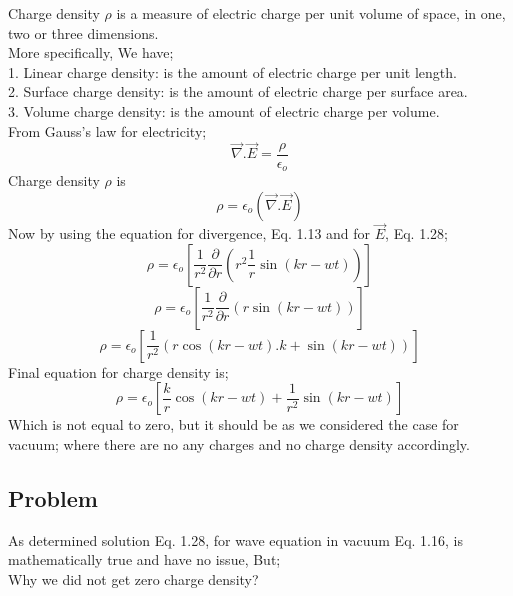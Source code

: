 Charge density $\rho$ is a measure of electric charge per unit volume of space, in one, two or three dimensions.\\
More specifically, We have;\\
1. Linear charge density: is the amount of electric charge per unit length.\\
2. Surface charge density: is the amount of electric charge per surface area.\\
3. Volume charge density: is the amount of electric charge per volume.\\
From Gauss's law for electricity;\\
\begin{equation}
\vec{\nabla}.\vec{E} = \frac{\rho}{\epsilon_{o}}
\end{equation}
Charge density $\rho$ is\\
\begin{equation}
\rho = {\epsilon_{o}}(\vec{\nabla}.\vec{E})
\end{equation}
Now by using the equation for divergence, Eq. 1.13 and for $\vec{E}$, Eq. 1.28;\\
\begin{equation}
\rho = {\epsilon_{o}}[\frac{1}{r^2}\frac{\partial}{\partial r}(r^2\frac{1}{r}\sin(kr-wt))]
\end{equation}
\begin{equation}
\rho = {\epsilon_{o}}[\frac{1}{r^2}\frac{\partial}{\partial r}(r\sin(kr-wt))]
\end{equation}
\begin{equation}
\rho = {\epsilon_{o}}[\frac{1}{r^2}(r\cos(kr-wt).k+\sin(kr-wt))]
\end{equation}
Final equation for charge density is;\\
\begin{equation}
\rho = {\epsilon_{o}}[\frac{k}{r}\cos(kr-wt)+\frac{1}{r^2}\sin(kr-wt)]
\end{equation}
Which is not equal to zero, but it should be as we considered the case for vacuum; where there are no any charges and no charge density accordingly.\\

\subsection{Problem}
As determined solution Eq. 1.28, for wave equation in vacuum Eq. 1.16, is mathematically true and have no issue, But;\\
Why we did not get zero charge density?


